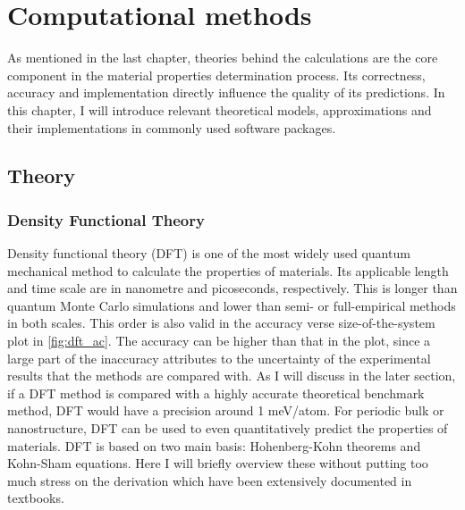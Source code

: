 
\chapter{Computational methods \label{chap:2}}

\ifpdf
    \graphicspath{{Chapter2/Figs/Raster/}{Chapter2/Figs/PDF/}{Chapter2/Figs/}{Chapter2/Figs/Vector/}}
\else
    \graphicspath{{Chapter2/Figs/Vector/}{Chapter2/Figs/}}
\fi

As mentioned in the last chapter, theories behind the calculations are the core component in the material properties determination process. Its correctness, accuracy and implementation directly influence the quality of its predictions. In this chapter, I will introduce relevant theoretical models, approximations and their implementations in commonly used software packages.

\section{Theory}
\subsection{Density Functional Theory}

Density functional theory (DFT) is one of the most widely used quantum mechanical method to calculate the properties of materials. Its applicable length and time scale are in nanometre and picoseconds, respectively. This is longer than quantum Monte Carlo simulations and lower than semi- or full-empirical methods in both scales. This order is also valid in the accuracy verse size-of-the-system plot in \autoref{fig:dft_ac}. The accuracy can be higher than that in the plot, since a large part of the inaccuracy attributes to the uncertainty of the experimental results that the methods are compared with\cite{Kirklin2015}. As I will discuss in the later section, if a DFT method is compared with a highly accurate theoretical benchmark method, DFT would have a precision around 1 meV/atom. For periodic bulk or nanostructure, DFT can be used to even quantitatively predict the properties of materials. DFT
is based on two main basis: Hohenberg-Kohn theorems\cite{Hohenberg1964} and Kohn-Sham equations\cite{Kohn1965}. Here I will briefly overview these without putting too much stress on the derivation which have been extensively documented in textbooks. 

